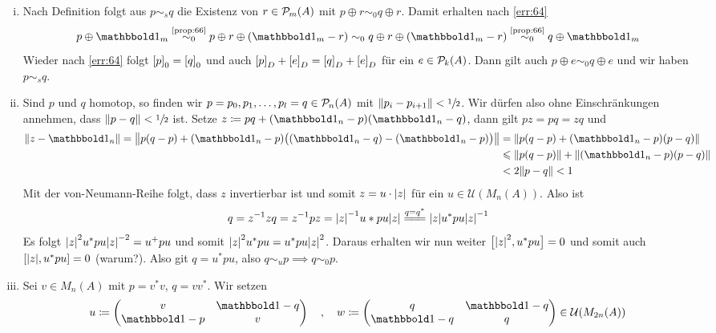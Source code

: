\begin{beweis}
	\begin{enumerate}[(i)]
		\item Nach Definition folgt aus $p \sim_s q$ die Existenz von $r \in \kernedP_m(A)$ mit $p \oplus r \sim_0 q \oplus r$.
		Damit erhalten nach \autoref{err:64}
		\[
			p \oplus \ind_m \StackText{\ref{prop:66}}{\sim_0} p \oplus r \oplus (\ind_m -r) \sim_0 q \oplus r \oplus (\ind_m -r) \StackText{\ref{prop:66}}{\sim_0} q \oplus \ind_m
		\]
		Wieder nach \autoref{err:64} folgt $\benbrace*{p}_0 = \benbrace*{q}_0$ und auch $\benbrace*{p}_D + \benbrace*{e}_D = \benbrace*{q}_D + \benbrace*{e}_D$ für ein $e \in \kernedP_k(A)$.
		Dann gilt auch $p \oplus e \sim_0 q \oplus e$ und wir haben $p \sim_s q$.
		\item Sind $p$ und $q$ homotop, so finden wir $p=p_0, p_1, \ldots , p_l=q \in \kernedP_n(A)$ mit $\norm*{p_i - p_{i+1}} < \sfrac{1}{2}$.
		Wir dürfen also ohne Einschränkungen annehmen, dass $\norm*{p-q} < \sfrac{1}{2}$ ist.
		Setze $z \coloneqq pq + (\ind_n -p)(\ind_n -q)$, dann gilt $pz = pq = zq$ und
		\begin{align}
			\norm*{z- \ind_n} = \norm*{p(q-p) + (\ind_n -p) \enbrace[\big]{(\ind_n -q) -(\ind_n -p)}} &= \norm*{p(q-p) + (\ind_n-p)(p-q)} \\
			&\le \norm*{p(q-p)} +\norm*{(\ind_n-p)(p-q)} \\
			&< 2 \norm*{p-q} < 1
		\end{align}
		Mit der von-Neumann-Reihe folgt, dass $z$ invertierbar ist und somit $z=u \cdot \abs*{z}$ für ein $u \in \mathcal{U}(M_n(A))$.
		Also ist 
		\[
			q= z^{-1}zq = z^{-1}pz = \abs*{z}^{-1} u* p u \abs*{z}  \stackrel{q=q^*}{=\joinrel=\joinrel=} \abs*{z} u^* p u \abs*{z}^{-1}  
		\]
		Es folgt $\abs*{z}^2 u^* p u \abs*{z}^{-2} = u^+ p u$ und somit $\abs*{z}^2 u^* p u = u^* p u \abs*{z}^2$.
		Daraus erhalten wir nun weiter $\benbrace[\big]{\abs*{z}^2, u^*p u }=0$ und somit auch $\benbrace*{\abs*{z},u^*pu} =0$ (warum?).
		Also git $q = u^* p u$, also $q \sim_u p \implies q \sim_0 p$.
		\item Sei $v \in M_n(A)$ mit $p=v^*v$, $q=vv^*$.
		Wir setzen 
		\[
			u \coloneqq \begin{pmatrix}
				v & \ind - q \\
				\ind -p & v
			\end{pmatrix} \quad, \quad 
			w \coloneqq \begin{pmatrix}
				q & \ind -q \\
				\ind -q & q
			\end{pmatrix} \in \mathcal{U} \enbrace*{M_{2n}(A)}
\]
\end{enumerate}
\end{beweis}
